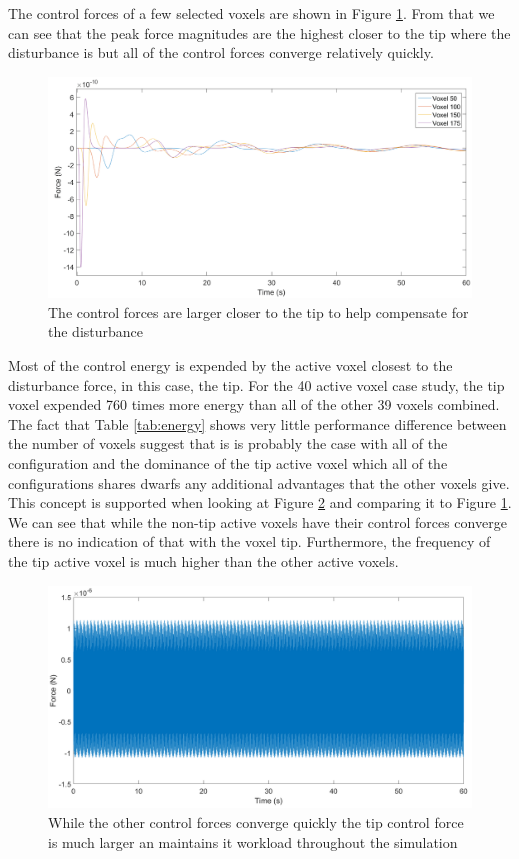 \documentclass[11pt]{ucthesis}
\begin{document}
The control forces of a few selected voxels are shown in Figure \ref{fig:control}. From that we can see that the peak force magnitudes are the highest closer to the tip where the disturbance is but all of the control forces converge relatively quickly.

\begin{figure}[h]
\centering
\includegraphics[width=0.9\linewidth]{Figures/40ActiveVoxelControlForce-01.png}
\caption{The control forces are larger closer to the tip to help compensate for the disturbance}
\label{fig:control}
\end{figure}

Most of the control energy is expended by the active voxel closest to the disturbance force, in this case, the tip. For the 40 active voxel case study, the tip voxel expended 760 times more energy than all of the other 39 voxels combined. The fact that Table \ref{tab:energy} shows very little performance difference between the number of voxels suggest that is is probably the case with all of the configuration and the dominance of the tip active voxel which all of the configurations shares dwarfs any additional advantages that the other voxels give. This concept is supported when looking at Figure \ref{fig:tipC} and comparing it to Figure \ref{fig:control}. We can see that while the non-tip active voxels have their control forces converge there is no indication of that with the voxel tip. Furthermore, the frequency of the tip active voxel is much higher than the other active voxels.

\begin{figure}[h]
\centering
\includegraphics[width=0.9\linewidth]{Figures/Force40ControlledTip12_10_206.png}
\caption{While the other control forces converge quickly the tip control force is much larger an maintains it workload throughout the simulation}
\label{fig:tipC}
\end{figure}
\end{document}
